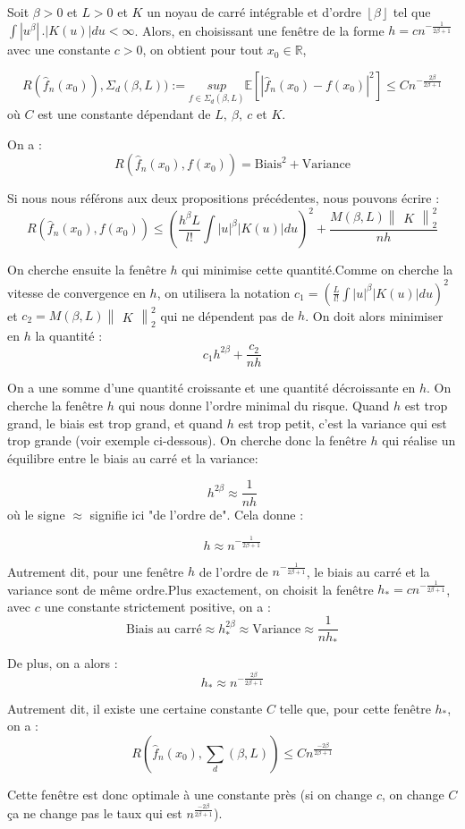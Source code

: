 \documentclass[
]{book}
\begin{document}
\begin{thm} Soit $\beta>0$ et $L>0$ et $K$ un noyau de carré intégrable et d'ordre $\left\lfloor{\beta}\right\rfloor$ tel que $\int |u^{\beta}|\,.|K(u)|du<\infty$. Alors, en choisissant une fenêtre de la forme $h=cn^{-\frac{1}{2\beta+1}}$ avec une constante $c>0$, on obtient pour tout $x_0 \in \mathbb{R}$,

$$ 
R(\hat {f}_n(x_0)),\Sigma_d(\beta, L)):= \underset{f\in\Sigma_d(\beta,L)}{sup}\mathbb{E}[|\hat {f}_n(x_0)-f(x_0)|^2]\leqslant Cn^{-\frac{2\beta}{2\beta+1}}
$$ 
 où $C$ est une constante dépendant de $L,~\beta,~ c$ et $K$.
 \end{thm}
\begin{demo}
  On a :
$$
 R(\hat {f}_n(x_0),f(x_0))= \text{Biais}^2 + \text{Variance}
$$ 

Si nous nous référons aux deux propositions précédentes, nous pouvons écrire :
$$
 R(\hat {f}_n(x_0),f(x_0))\leqslant(\frac{h^{\beta}L}{l!}\int |u|^{\beta}|K(u)|du)^2 + \frac{M(\beta,L)\begin{Vmatrix}K\end{Vmatrix}_2^2}{nh}
$$

On cherche ensuite la fenêtre $h$ qui minimise cette quantité.Comme on cherche la vitesse de convergence en $h$, on utilisera la notation $c_1=(\frac{L}{l!}\int |u|^{\beta}|K(u)|du)^2$ et $c_2=M(\beta,L)\begin{Vmatrix}K\end{Vmatrix}_2^2$ qui ne dépendent pas de $h$. On doit alors minimiser en $h$ la quantité :
$$
  c_1h^{2\beta}+\frac{c_2}{nh}
$$

On a une somme d'une quantité croissante et une quantité décroissante en $h$. On cherche la fenêtre $h$ qui nous donne l'ordre minimal du risque. Quand $h$ est trop grand, le biais est trop grand, et quand $h$ est trop petit, c'est la variance qui est trop grande (voir exemple ci-dessous). On cherche donc la fenêtre $h$ qui réalise un équilibre entre le biais au carré et la variance:

$$ 
  h^{2\beta}\approx\frac{1}{nh}
$$
où le signe $\approx$ signifie ici "de l'ordre de". Cela donne :

$$
  h\approx n^{-\frac{1}{2\beta +1}}
$$

Autrement dit, pour une fenêtre $h$ de l'ordre de $n^{-\frac{1}{2\beta+1}}$, le biais au carré et la variance sont de même ordre.Plus exactement, on choisit la fenêtre $h_*=cn^{-\frac{1}{2\beta+1}}$, avec $c$ une constante strictement positive, on a :
$$
  \text{Biais au carré} \approx h_{*}^{2\beta}\approx \text{Variance} \approx \frac{1}{nh_{*}}
$$

De plus, on a alors :
$$
  h_* \approx n^{-\frac{2\beta}{2\beta + 1}}
$$

Autrement dit, il existe une certaine constante $C$ telle que, pour cette fenêtre $h_*$, on a :
$$
  R(\hat {f}_n(x_0),\sum_d(\beta,L))\leqslant Cn^{\frac{-2\beta}{2\beta + 1}}
$$

  Cette fenêtre est donc optimale à une constante près (si on change $c$, on change $C$ ça ne change pas le taux qui est $n^{\frac{-2\beta}{2\beta+1}}$).\newline
\end{demo}
\end{document}
